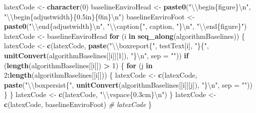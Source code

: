\documentclass[]{article}
\newenvironment{Shaded}{\begin{snugshade}}{\end{snugshade}}
\newcommand{\KeywordTok}[1]{\textcolor[rgb]{0.13,0.29,0.53}{\textbf{#1}}}
\newcommand{\DataTypeTok}[1]{\textcolor[rgb]{0.13,0.29,0.53}{#1}}
\newcommand{\DecValTok}[1]{\textcolor[rgb]{0.00,0.00,0.81}{#1}}
\newcommand{\CharTok}[1]{\textcolor[rgb]{0.31,0.60,0.02}{#1}}
\newcommand{\StringTok}[1]{\textcolor[rgb]{0.31,0.60,0.02}{#1}}
\newcommand{\CommentTok}[1]{\textcolor[rgb]{0.56,0.35,0.01}{\textit{#1}}}
\newcommand{\ControlFlowTok}[1]{\textcolor[rgb]{0.13,0.29,0.53}{\textbf{#1}}}
\newcommand{\OperatorTok}[1]{\textcolor[rgb]{0.81,0.36,0.00}{\textbf{#1}}}
\newcommand{\NormalTok}[1]{#1}
\begin{document}
\begin{Shaded}
\begin{Highlighting}[]
  
\NormalTok{  latexCode <-}\StringTok{ }\KeywordTok{character}\NormalTok{(}\DecValTok{0}\NormalTok{)}
\NormalTok{  baselineEnviroHead <-}\StringTok{ }\KeywordTok{paste0}\NormalTok{(}\StringTok{"}\CharTok{\textbackslash{}\textbackslash{}}\StringTok{begin\{figure\}}\CharTok{\textbackslash{}n}\StringTok{"}\NormalTok{,}
                              \StringTok{"}\CharTok{\textbackslash{}\textbackslash{}}\StringTok{begin\{adjustwidth\}\{0.5in\}\{0in\}}\CharTok{\textbackslash{}n}\StringTok{"}\NormalTok{)}
\NormalTok{  baselineEnviroFoot <-}\StringTok{ }\KeywordTok{paste0}\NormalTok{(}\StringTok{"}\CharTok{\textbackslash{}\textbackslash{}}\StringTok{end\{adjustwidth\}}\CharTok{\textbackslash{}n}\StringTok{"}\NormalTok{,}
                               \StringTok{"}\CharTok{\textbackslash{}\textbackslash{}}\StringTok{caption\{"}\NormalTok{,}
\NormalTok{                               caption,}
                               \StringTok{"\}}\CharTok{\textbackslash{}n}\StringTok{"}\NormalTok{,}
                               \StringTok{"}\CharTok{\textbackslash{}\textbackslash{}}\StringTok{end\{figure\}"}\NormalTok{)}
\NormalTok{  latexCode <-}\StringTok{ }\NormalTok{baselineEnviroHead}
  \ControlFlowTok{for}\NormalTok{ (i }\ControlFlowTok{in} \KeywordTok{seq_along}\NormalTok{(algorithmBaselines)) \{}
\NormalTok{    latexCode <-}\StringTok{ }\KeywordTok{c}\NormalTok{(latexCode, }
                   \KeywordTok{paste}\NormalTok{(}\StringTok{"}\CharTok{\textbackslash{}\textbackslash{}}\StringTok{boxreport\{"}\NormalTok{, }
\NormalTok{                         testText[i], }
                         \StringTok{"\}\{"}\NormalTok{, }
                         \KeywordTok{unitConvert}\NormalTok{(algorithmBaselines[[i]][}\DecValTok{1}\NormalTok{]), }
                         \StringTok{"\}}\CharTok{\textbackslash{}n}\StringTok{"}\NormalTok{, }
                         \DataTypeTok{sep =} \StringTok{""}\NormalTok{))}
    \ControlFlowTok{if}\NormalTok{ (}\KeywordTok{length}\NormalTok{(algorithmBaselines[[i]]) }\OperatorTok{>}\StringTok{ }\DecValTok{1}\NormalTok{) \{}
      \ControlFlowTok{for}\NormalTok{ (j }\ControlFlowTok{in} \DecValTok{2}\OperatorTok{:}\KeywordTok{length}\NormalTok{(algorithmBaselines[[i]])) \{}
\NormalTok{        latexCode <-}\StringTok{ }\KeywordTok{c}\NormalTok{(latexCode, }
                       \KeywordTok{paste}\NormalTok{(}\StringTok{"}\CharTok{\textbackslash{}\textbackslash{}}\StringTok{boxpersist\{"}\NormalTok{, }
                             \KeywordTok{unitConvert}\NormalTok{(algorithmBaselines[[i]][j]), }
                             \StringTok{"\}}\CharTok{\textbackslash{}n}\StringTok{"}\NormalTok{, }
                             \DataTypeTok{sep =} \StringTok{""}\NormalTok{))}
\NormalTok{      \}}
\NormalTok{    \}}
\NormalTok{    latexCode <-}\StringTok{ }\KeywordTok{c}\NormalTok{(latexCode, }\StringTok{"}\CharTok{\textbackslash{}\textbackslash{}}\StringTok{vspace\{0.3cm\}}\CharTok{\textbackslash{}n}\StringTok{"}\NormalTok{)}
\NormalTok{  \}}
\NormalTok{  latexCode <-}\StringTok{ }\KeywordTok{c}\NormalTok{(latexCode, baselineEnviroFoot)}
  \CommentTok{# latexCode}
\NormalTok{\}}
\end{Highlighting}
\end{Shaded}
\end{document}
